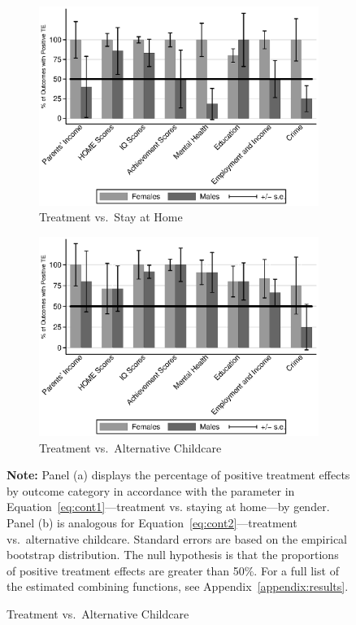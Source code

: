 \begin{figure}[H]
 \centering
 \caption{Proportion of Positively Impacted Outcomes by Category}\label{fig:cats-positive}
 \begin{subfigure}[h]{0.7\textwidth}
 	\centering
 	\caption{Treatment vs.\ Stay at Home} \label{fig:cats-positivehome}
 		\includegraphics[width=\textwidth]{output/epan_ipw_p0_cats1.eps}
 \end{subfigure}
 
 \begin{subfigure}[h]{0.7\textwidth}
 	\centering
 	\caption{Treatment vs.\ Alternative Childcare} \label{fig:cats-positivealt}
 		\includegraphics[width=\textwidth]{output/epan_ipw_p1_cats1.eps}
 \end{subfigure}
 \footnotesize \justify
\footnotesize \justify
\textbf{Note:} Panel (a) displays the percentage of positive treatment effects by outcome category in accordance with the parameter in Equation~\eqref{eq:cont1}---treatment vs. staying at home---by gender. Panel (b) is analogous for Equation~\eqref{eq:cont2}---treatment vs.\ alternative childcare. Standard errors are based on the empirical bootstrap distribution. The null hypothesis is that the proportions of positive treatment effects are greater than 50\%. For a full list of the estimated combining functions, see Appendix~\ref{appendix:results}. \\
 \end{figure}
 
